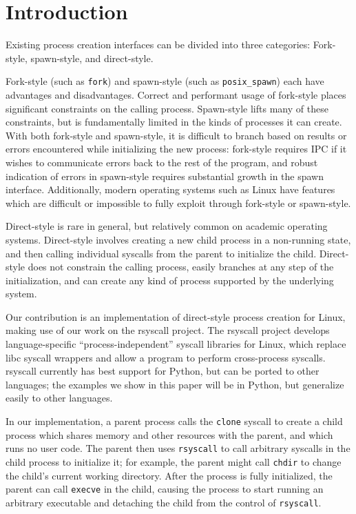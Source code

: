 \documentclass{acmart}
\begin{document}
\section{Introduction}\label{introduction}
Existing process creation interfaces can be divided into three categories:
Fork-style, spawn-style, and direct-style.

Fork-style (such as \texttt{fork}) and spawn-style (such as \texttt{posix\_spawn}) each have advantages and disadvantages.
Correct and performant usage of fork-style places significant constraints on the calling process.
Spawn-style lifts many of these constraints,
but is fundamentally limited in the kinds of processes it can create.
With both fork-style and spawn-style,
it is difficult to
branch based on results or errors encountered while initializing the new process:
fork-style requires IPC if it wishes to communicate errors back to the rest of the program,
and robust indication of errors in spawn-style requires substantial growth in the spawn interface.
Additionally, modern operating systems such as Linux have features
which are difficult or impossible to fully exploit through fork-style or spawn-style.

Direct-style is rare in general, but relatively common on academic operating systems.
Direct-style involves creating a new child process in a non-running state,
and then calling individual syscalls from the parent to initialize the child.
Direct-style does not constrain the calling process,
easily branches at any step of the initialization,
and can create any kind of process supported by the underlying system.

Our contribution is an implementation of direct-style process creation for Linux,
making use of our work on the rsyscall project.
The rsyscall project develops language-specific ``process-independent'' syscall libraries for Linux,
which replace libc syscall wrappers and allow a program to perform cross-process syscalls.
rsyscall currently has best support for Python,
but can be ported to other languages;
the examples we show in this paper will be in Python,
but generalize easily to other languages.

In our implementation, a parent process calls the \texttt{clone} syscall
to create a child process which shares memory and other resources with the parent,
and which runs no user code.
The parent then uses \texttt{rsyscall}
to call arbitrary syscalls in the child process to initialize it;
for example, the parent might call \texttt{chdir} to change the child's current working directory.
After the process is fully initialized,
the parent can call \texttt{execve} in the child,
causing the process to start running an arbitrary executable
and detaching the child from the control of \texttt{rsyscall}.
\end{document}
